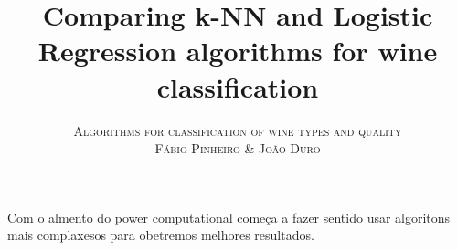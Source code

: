 \documentclass[twoside]{article}
\title{\vspace{-15mm}\fontsize{24pt}{10pt}\selectfont\textbf{Comparing k-NN and Logistic Regression algorithms for wine classification}}
\author{
\large
\textsc{Algorithms for classification of wine types and quality}\\[2mm]
\textsc{F\'{a}bio Pinheiro  \& Jo\~{a}o Duro}\\[2mm]
\vspace{-5mm}
}
\date{}
\begin{document}
\maketitle %


\begin{abstract}


\end{abstract}
Com o almento do power computational começa a fazer sentido usar algoritons mais complaxesos para obetremos melhores resultados.

\end{document}
